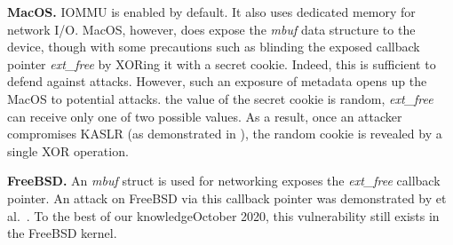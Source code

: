 \smallskip
\noindent\textbf{MacOS.} IOMMU \DIFaddbegin {}\DIFaddend is enabled by default. It also uses dedicated memory for network I/O. MacOS, however, does expose the \textit{mbuf} data structure to the device, though with some precautions such as blinding the exposed callback pointer \textit{ext\_free} by XORing it with a secret cookie.
Indeed, this is sufficient to defend against \simple attacks. However, such an exposure of metadata opens up the MacOS to potential \compound attacks.
\DIFdelbegin {}\DIFdelend \DIFaddbegin {}\DIFaddend the value of the secret cookie is random, \textit{ext\_free} can receive only one of two possible values. As a result, once an attacker compromises \DIFdelbegin {}\DIFdelend \DIFaddbegin {}\DIFaddend KASLR (as demonstrated in \cite{thunder}), the random cookie is revealed by a single XOR operation.  

\smallskip
\noindent\textbf{FreeBSD.} An \textit{mbuf} struct \DIFdelbegin {}\DIFdelend \DIFaddbegin {}\DIFaddend is used for networking exposes the \textit{ext\_free} callback pointer. An attack on FreeBSD via this callback pointer was demonstrated by \DIFdelbegin {}\DIFdelend \DIFaddbegin {}\DIFaddend et al.~\cite{thunder}. To the best of our knowledge\DIFdelbegin \DIFdel{(}\DIFdelend \DIFaddbegin {}\DIFaddend October 2020\DIFdelbegin \DIFdel{)}\DIFdelend , this vulnerability still exists in the FreeBSD kernel.

